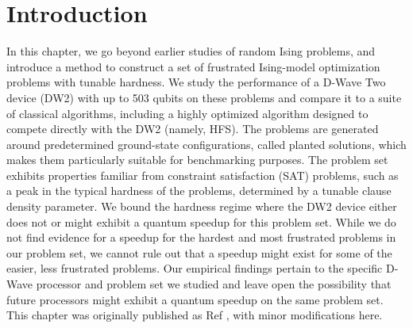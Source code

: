 %
%
%
%
%





\section{Introduction}
In this chapter, we go beyond earlier studies of random Ising problems, and introduce a method to construct a set of frustrated Ising-model optimization problems with tunable hardness. We study the performance of a D-Wave Two device (DW2) with up to 503 qubits on these problems and compare it to a suite of classical algorithms, including a highly optimized algorithm designed to compete directly with the DW2 (namely, HFS). The problems are generated around predetermined ground-state configurations, called planted solutions, which makes them particularly suitable for benchmarking purposes. The problem set exhibits properties familiar from constraint satisfaction (SAT) problems, such as a peak in the typical hardness of the problems, determined by a tunable clause density parameter.  We bound the hardness regime where the DW2 device either does not or might exhibit a quantum speedup for this problem set. While we do not find evidence for a speedup for the hardest and most frustrated problems in our problem set, we cannot rule out that a speedup might exist for some of the easier, less frustrated problems. Our empirical findings pertain to the specific D-Wave processor and problem set we studied and leave open the possibility that future processors might exhibit a quantum speedup on the same problem set. This chapter was originally published as Ref \cite{Hen:2015rt}, with minor modifications here.

